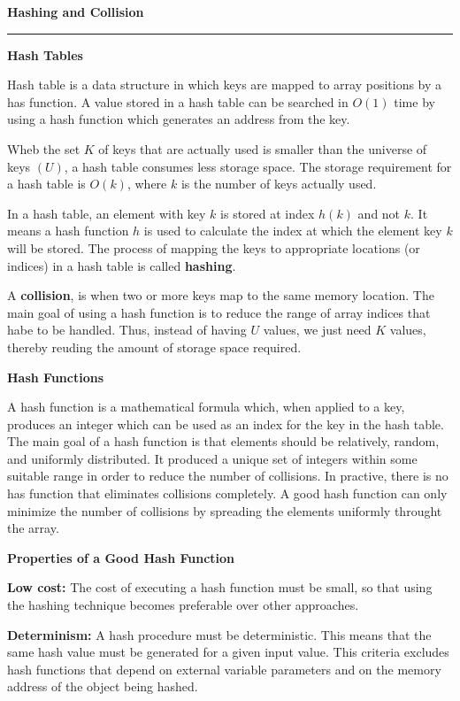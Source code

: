 {\bf Hashing and Collision}
\vskip 1mm
\hrule

\vskip 3mm
{\bf Hash Tables}

\vskip 1mm
Hash table is a data structure in which keys are mapped to array positions by a has function. A value stored in a hash table can be searched in $O(1)$ time by using a hash function which generates an address from the key.

\vskip 1mm
Wheb the set $K$ of keys that are actually used is smaller than the universe of keys $(U)$, a hash table consumes less storage space. The storage requirement for a hash table is $O(k)$, where $k$ is the number of keys actually used.

\vskip 1mm
In a hash table, an element with key $k$ is stored at index $h(k)$ and not $k$. It means a hash function $h$ is used to calculate the index at which the element key $k$ will be stored. The process of mapping the keys to appropriate locations (or indices) in a hash table is called {\bf hashing}.

\vskip 1mm
A {\bf collision}, is when two or more keys map to the same memory location. The main goal of using a hash function is to reduce the range of array indices that habe to be handled. Thus, instead of having $U$ values, we just need $K$ values, thereby reuding the amount of storage space required.

\filbreak
\vskip 1cm
{\bf Hash Functions}

\vskip 3mm
A hash function is a mathematical formula which, when applied to a key, produces an integer which can be used as an index for the key in the hash table. The main goal of a hash function is that elements should be relatively, random, and uniformly distributed. It produced a unique set of integers within some suitable range in order to reduce the number of collisions. In practive, there is no has function that eliminates collisions completely. A good hash function can only minimize the number of collisions by spreading the elements uniformly throught the array.

\vskip 3mm
{\bf Properties of a Good Hash Function}

\vskip 1mm
{\bf Low cost:} The cost of executing a hash function must be small, so that using the hashing technique becomes preferable over other approaches.

\vskip 3mm
{\bf Determinism:} A hash procedure must be deterministic. This means that the same hash value must be generated for a given input value. This criteria excludes hash functions that depend on external variable parameters and on the memory address of the object being hashed.

